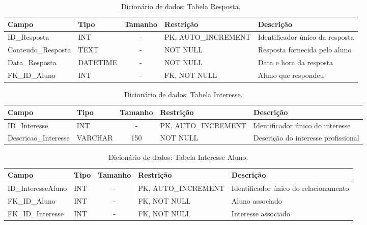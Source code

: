 \begin{table}[H]
    \centering
    \ABNTEXfontereduzida
    \caption[Dicionário de Dados - Tabela Resposta]{Dicionário de dados: Tabela Resposta.}
    \label{tab-tb-resposta}
    \begin{tabular}{p{3.5cm}|p{2cm}|c|p{3.5cm}|p{4cm}}
    \textbf{Campo} & \textbf{Tipo} & \textbf{Tamanho} & \textbf{Restrição} & \textbf{Descrição} \\
    \hline
    ID\_Resposta & INT & - & PK, AUTO\_INCREMENT & Identificador único da resposta \\
    \hline
    Conteudo\_Resposta & TEXT & - & NOT NULL & Resposta fornecida pelo aluno \\
    \hline
    Data\_Resposta & DATETIME & - & NOT NULL & Data e hora da resposta \\
    \hline
    FK\_ID\_Aluno & INT & - & FK, NOT NULL & Aluno que respondeu \\
    \end{tabular}
\end{table}

\begin{table}[H]
    \centering
    \ABNTEXfontereduzida
    \caption[Dicionário de Dados - Tabela Interesse]{Dicionário de dados: Tabela Interesse.}
    \label{tab-tb-interesse}
    \begin{tabular}{p{3.5cm}|p{2cm}|c|p{3.5cm}|p{4cm}}
    \textbf{Campo} & \textbf{Tipo} & \textbf{Tamanho} & \textbf{Restrição} & \textbf{Descrição} \\
    \hline
    ID\_Interesse & INT & - & PK, AUTO\_INCREMENT & Identificador único do interesse \\
    \hline
    Descricao\_Interesse & VARCHAR & 150 & NOT NULL & Descrição do interesse profissional \\
    \end{tabular}
\end{table}

\begin{table}[H]
    \centering
    \ABNTEXfontereduzida
    \caption[Dicionário de Dados - Tabela Interesse Aluno]{Dicionário de dados: Tabela Interesse Aluno.}
    \label{tab-tb-interesse-aluno}
    \begin{tabular}{p{3.5cm}|p{2cm}|c|p{3.5cm}|p{4cm}}
    \textbf{Campo} & \textbf{Tipo} & \textbf{Tamanho} & \textbf{Restrição} & \textbf{Descrição} \\
    \hline
    ID\_InteresseAluno & INT & - & PK, AUTO\_INCREMENT & Identificador único do relacionamento \\
    \hline
    FK\_ID\_Aluno & INT & - & FK, NOT NULL & Aluno associado \\
    \hline
    FK\_ID\_Interesse & INT & - & FK, NOT NULL & Interesse associado \\
    \end{tabular}
\end{table}


